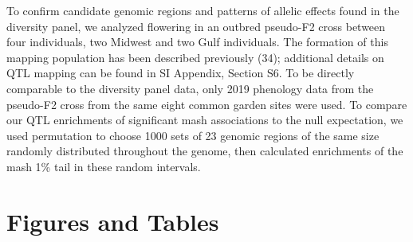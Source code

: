 \documentclass[
  9pt,
  twocolumn,
  twoside]{pnas-new}
\begin{document}
To confirm candidate genomic regions and patterns of allelic effects
found in the diversity panel, we analyzed flowering in an outbred
pseudo-F2 cross between four individuals, two Midwest and two Gulf
individuals. The formation of this mapping population has been described
previously (34); additional details on QTL mapping can be found in SI
Appendix, Section S6. To be directly comparable to the diversity panel
data, only 2019 phenology data from the pseudo-F2 cross from the same
eight common garden sites were used. To compare our QTL enrichments of
significant mash associations to the null expectation, we used
permutation to choose 1000 sets of 23 genomic regions of the same size
randomly distributed throughout the genome, then calculated enrichments
of the mash 1\% tail in these random intervals.

\section{Figures and Tables}\label{figures-and-tables}
\end{document}
